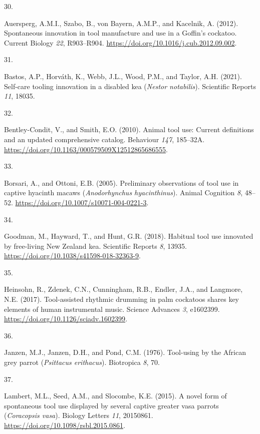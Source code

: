 \documentclass[
  man, donotrepeattitle,floatsintext]{apa6}
\newlength{\cslhangindent}
\newlength{\csllabelwidth}
\newlength{\cslentryspacingunit} %
\newenvironment{CSLReferences}[2] %
 {%
  \setlength{\parindent}{0pt}
  \ifodd #1
  \let\oldpar\par
  \def\par{\hangindent=\cslhangindent\oldpar}
  \fi
  \setlength{\parskip}{#2\cslentryspacingunit}
 }%
 {}
\newcommand{\CSLLeftMargin}[1]{\parbox[t]{\csllabelwidth}{#1}}
\newcommand{\CSLRightInline}[1]{\parbox[t]{\linewidth - \csllabelwidth}{#1}\break}
\begin{document}
\begin{CSLReferences}{0}{0}
\leavevmode{}%
\CSLLeftMargin{30. }%
\CSLRightInline{Auersperg, A.M.I., Szabo, B., von Bayern, A.M.P., and Kacelnik, A. (2012). Spontaneous innovation in tool manufacture and use in a {G}offin's cockatoo. Current Biology \emph{22}, R903--R904. \url{https://doi.org/10.1016/j.cub.2012.09.002}.}

\leavevmode{}%
\CSLLeftMargin{31. }%
\CSLRightInline{Bastos, A.P., Horváth, K., Webb, J.L., Wood, P.M., and Taylor, A.H. (2021). Self-care tooling innovation in a disabled kea (\emph{{N}estor notabilis}). Scientific Reports \emph{11}, 18035.}

\leavevmode{}%
\CSLLeftMargin{32. }%
\CSLRightInline{Bentley-Condit, V., and Smith, E.O. (2010). Animal tool use: Current definitions and an updated comprehensive catalog. Behaviour \emph{147}, 185--32A. \url{https://doi.org/10.1163/000579509X12512865686555}.}

\leavevmode{}%
\CSLLeftMargin{33. }%
\CSLRightInline{Borsari, A., and Ottoni, E.B. (2005). Preliminary observations of tool use in captive hyacinth macaws (\emph{{A}nodorhynchus hyacinthinus}). Animal Cognition \emph{8}, 48--52. \url{https://doi.org/10.1007/s10071-004-0221-3}.}

\leavevmode{}%
\CSLLeftMargin{34. }%
\CSLRightInline{Goodman, M., Hayward, T., and Hunt, G.R. (2018). Habitual tool use innovated by free-living {N}ew {Z}ealand kea. Scientific Reports \emph{8}, 13935. \url{https://doi.org/10.1038/s41598-018-32363-9}.}

\leavevmode{}%
\CSLLeftMargin{35. }%
\CSLRightInline{Heinsohn, R., Zdenek, C.N., Cunningham, R.B., Endler, J.A., and Langmore, N.E. (2017). Tool-assisted rhythmic drumming in palm cockatoos shares key elements of human instrumental music. Science Advances \emph{3}, e1602399. \url{https://doi.org/10.1126/sciadv.1602399}.}

\leavevmode{}%
\CSLLeftMargin{36. }%
\CSLRightInline{Janzen, M.J., Janzen, D.H., and Pond, C.M. (1976). Tool-using by the {A}frican grey parrot (\emph{{P}sittacus erithacus}). Biotropica \emph{8}, 70.}

\leavevmode{}%
\CSLLeftMargin{37. }%
\CSLRightInline{Lambert, M.L., Seed, A.M., and Slocombe, K.E. (2015). A novel form of spontaneous tool use displayed by several captive greater vasa parrots (\emph{{C}oracopsis vasa}). Biology Letters \emph{11}, 20150861. \url{https://doi.org/10.1098/rsbl.2015.0861}.}


\end{CSLReferences}
\end{document}
